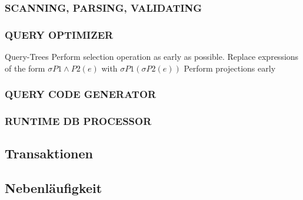 \subsubsection{SCANNING, PARSING, VALIDATING}

\subsubsection{QUERY OPTIMIZER}

Query-Trees
Perform selection operation as early as possible.
Replace expressions of the form
$\sigma P1 \land P2 (e)$
with
$\sigma P1 (\sigma P2 (e))$
Perform projections early

\subsubsection{QUERY CODE GENERATOR}

\subsubsection{RUNTIME DB PROCESSOR}

%
%
\subsection{Transaktionen}

%
%
\subsection{Nebenläufigkeit}
